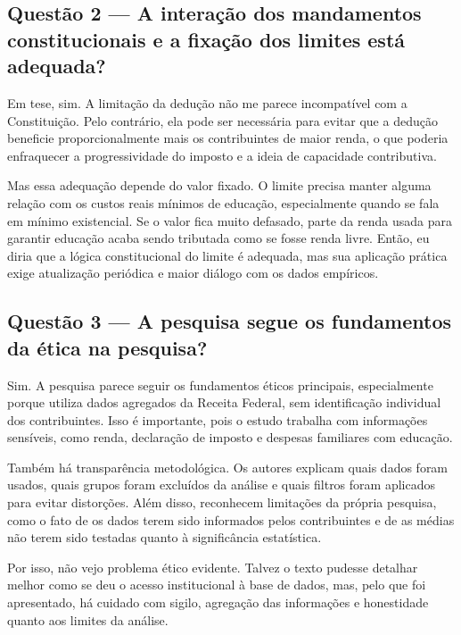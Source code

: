 \documentclass[12pt,a4paper]{article}
\begin{document}
\subsection*{Questão 2 — A interação dos mandamentos constitucionais e a fixação dos limites está adequada?}
\label{sec:orga8bde5a}

Em tese, sim. A limitação da dedução não me parece incompatível com a Constituição. Pelo contrário, ela pode ser necessária para evitar que a dedução beneficie proporcionalmente mais os contribuintes de maior renda, o que poderia enfraquecer a progressividade do imposto e a ideia de capacidade contributiva.

Mas essa adequação depende do valor fixado. O limite precisa manter alguma relação com os custos reais mínimos de educação, especialmente quando se fala em mínimo existencial. Se o valor fica muito defasado, parte da renda usada para garantir educação acaba sendo tributada como se fosse renda livre. Então, eu diria que a lógica constitucional do limite é adequada, mas sua aplicação prática exige atualização periódica e maior diálogo com os dados empíricos.

\subsection*{Questão 3 — A pesquisa segue os fundamentos da ética na pesquisa?}
\label{sec:orgabe8ecf}

Sim. A pesquisa parece seguir os fundamentos éticos principais, especialmente porque utiliza dados agregados da Receita Federal, sem identificação individual dos contribuintes. Isso é importante, pois o estudo trabalha com informações sensíveis, como renda, declaração de imposto e despesas familiares com educação.

Também há transparência metodológica. Os autores explicam quais dados foram usados, quais grupos foram excluídos da análise e quais filtros foram aplicados para evitar distorções. Além disso, reconhecem limitações da própria pesquisa, como o fato de os dados terem sido informados pelos contribuintes e de as médias não terem sido testadas quanto à significância estatística.

Por isso, não vejo problema ético evidente. Talvez o texto pudesse detalhar melhor como se deu o acesso institucional à base de dados, mas, pelo que foi apresentado, há cuidado com sigilo, agregação das informações e honestidade quanto aos limites da análise.
\end{document}
